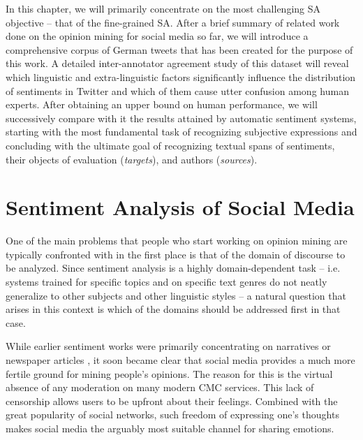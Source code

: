 In this chapter, we will primarily concentrate on the most challenging
SA objective -- that of the fine-grained SA.  After a brief summary of
related work done on the opinion mining for social media so far, we
will introduce a comprehensive corpus of German tweets that has been
created for the purpose of this work.  A detailed inter-annotator
agreement study of this dataset will reveal which linguistic and
extra-linguistic factors significantly influence the distribution of
sentiments in Twitter and which of them cause utter confusion among
human experts.  After obtaining an upper bound on human performance,
we will successively compare with it the results attained by automatic
sentiment systems, starting with the most fundamental task of
recognizing subjective expressions and concluding with the ultimate
goal of recognizing textual spans of sentiments, their objects of
evaluation (\emph{targets}), and authors (\emph{sources}).

\section{Sentiment Analysis of Social Media}

One of the main problems that people who start working on opinion
mining are typically confronted with in the first place is that of the
domain of discourse to be analyzed.  Since sentiment analysis is a
highly domain-dependent task \citep[cf.][]{Aue:05,Blitzer:07,Jakob:10}
-- i.e. systems trained for specific topics and on specific text
genres do not neatly generalize to other subjects and other linguistic
styles -- a natural question that arises in this context is which of
the domains should be addressed first in that case.

While earlier sentiment works were primarily concentrating on
narratives \citep{Wiebe:90a,Wiebe:94} or newspaper articles
\citep{Wiebe:03,Wiebe:05}, it soon became clear that social media
provides a much more fertile ground for mining people's opinions.  The
reason for this is the virtual absence of any moderation on many
modern CMC services.  This lack of censorship allows users to be
upfront about their feelings.  Combined with the great popularity of
social networks, such freedom of expressing one's thoughts makes
social media the arguably most suitable channel for sharing emotions.

